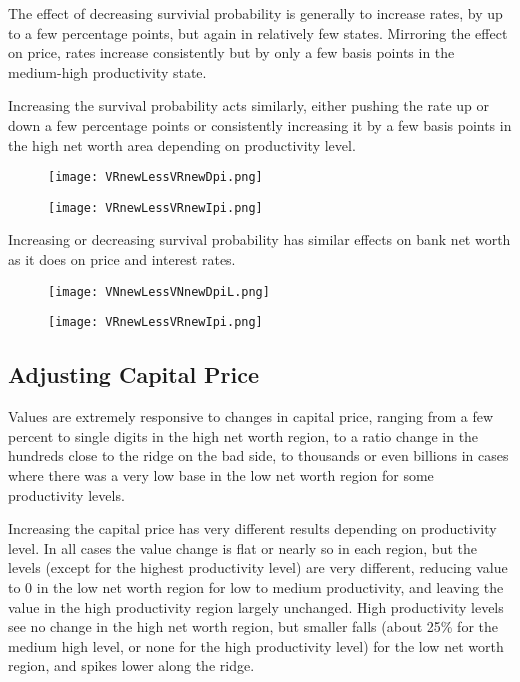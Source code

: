 \documentclass[english]{article}
\begin{document}
The effect of decreasing survivial probability is generally to increase rates, by 
up to a few percentage points, but again in relatively few states. Mirroring the 
effect on price, rates increase consistently but by only a few basis points in 
the medium-high productivity state. 

Increasing the survival probability acts similarly, either pushing the rate up or down 
a few percentage points or consistently increasing it by a few basis points in the 
high net worth area depending on productivity level.

\begin{figure}[H]
\centering
		\texttt{[image: VRnewLessVRnewDpi.png]}
\end{figure}
\begin{figure}[H]
\centering
		\texttt{[image: VRnewLessVRnewIpi.png]}
\end{figure}

Increasing or decreasing survival probability has similar effects on bank net worth 
as it does on price and interest rates. 

\begin{figure}[H]
\centering
		\texttt{[image: VNnewLessVNnewDpiL.png]}
\end{figure}
\begin{figure}[H]
\centering
		\texttt{[image: VRnewLessVRnewIpi.png]}
\end{figure}


\subsection{Adjusting Capital Price}
Values are extremely responsive to changes in capital price, ranging from a few percent to 
single digits in the high net worth region, to a ratio change in the hundreds close to 
the ridge on the bad side, to thousands or even billions in cases where there was a 
very low base in the low net worth region for some productivity levels.

Increasing the capital price has very different results depending on productivity level. 
In all cases the value change is flat or nearly so in each region, but the levels (except for 
the highest productivity level) are very different, reducing value to 0 in the low net worth region 
for low to medium productivity, and leaving the value in the high productivity region 
largely unchanged. High productivity levels see no change in the 
high net worth region, but smaller falls (about 25\% for the medium high level, or none 
for the high productivity level) for the low net worth region, and spikes lower along the ridge.
\end{document}

